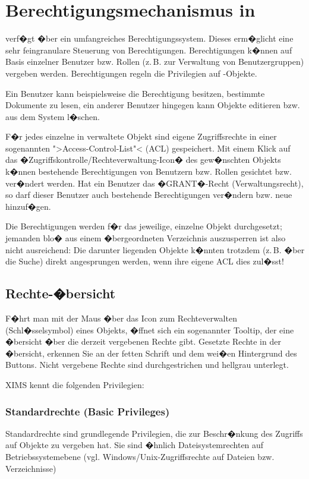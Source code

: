 \section{Berechtigungsmechanismus in }
\label{berechtigungen}

 verf�gt �ber ein umfangreiches Berechtigungssystem. Dieses erm�glicht eine
sehr feingranulare Steuerung von Berechtigungen. Berechtigungen k�nnen auf
Basis einzelner Benutzer bzw. Rollen (z.\,B. zur Verwaltung von Benutzergruppen)
vergeben werden. Berechtigungen regeln die Privilegien auf -Objekte.

Ein Benutzer kann beispielsweise die Berechtigung besitzen, bestimmte Dokumente
zu lesen, ein anderer Benutzer hingegen kann Objekte editieren bzw. aus dem
System l�schen.

F�r jedes einzelne in  verwaltete Objekt sind eigene Zugriffsrechte in einer
sogenannten ">Access-Control-List"< (ACL) gespeichert. Mit einem Klick auf das �Zugriffskontrolle/Rechteverwaltung-Icon�
des gew�nschten Objekts k�nnen bestehende Berechtigungen von Benutzern bzw.
Rollen gesichtet bzw. ver�ndert werden. Hat ein Benutzer das �GRANT�-Recht
(Verwaltungsrecht), so darf dieser Benutzer auch bestehende Berechtigungen
ver�ndern bzw. neue hinzuf�gen.

\begin{Hinweis}
  Die Berechtigungen werden f�r das jeweilige, einzelne Objekt
  durchgesetzt; jemanden blo� aus einem �bergeordneten Verzeichnis
  auszusperren ist also nicht ausreichend: Die darunter liegenden
  Objekte k�nnten trotzdem (z.\,B. �ber die Suche) direkt angesprungen
  werden, wenn ihre eigene ACL dies zul�sst!
\end{Hinweis}

\subsection{Rechte-�bersicht}
F�hrt man mit der Maus �ber das Icon zum Rechteverwalten (Schl�sselsymbol) eines Objekts, �ffnet sich ein sogenannter Tooltip, der eine �bersicht �ber die derzeit vergebenen Rechte gibt. Gesetzte Rechte in der �bersicht, erkennen Sie an der fetten Schrift und dem wei�en Hintergrund des Buttons. Nicht vergebene Rechte sind durchgestrichen und hellgrau unterlegt.

XIMS kennt die folgenden Privilegien:

\subsubsection{Standardrechte (Basic Privileges)}
\label{standardrechte}
Standardrechte sind grundlegende Privilegien, die  zur Beschr�nkung des
Zugriffs auf Objekte zu vergeben hat. Sie sind �hnlich Dateisystemrechten auf
Betriebssystemebene (vgl. Windows/Unix-Zugriffsrechte auf Dateien bzw.
Verzeichnisse)


